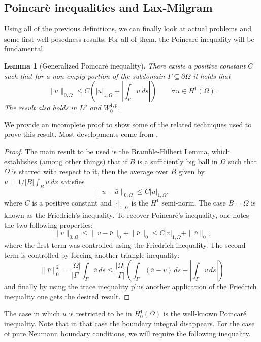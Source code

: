 \documentclass{article}
\newtheorem{lemma}{Lemma}
\begin{document}
\subsection{Poincarè inequalities and Lax-Milgram}


Using all of the previous definitions, we can finally look at actual problems and some first well-posedness results. For all of them, the Poincaré inequality will be fundamental.

\begin{lemma}[Generalized Poincaré inequality] There exists a positive constant $C$ such that for a non-empty portion of the subdomain $\Gamma \subseteq \partial\Omega$ it holds that
        $$ \| u \|_{0,\Omega} \leq C\left(| u |_{1,\Omega} + \left|\int_\Gamma u\,ds\right| \right) \qquad \forall u \in H^1(\Omega). $$
The result also holds in $L^p$ and $W_0^{1,p}$. 
\end{lemma}

We provide an incomplete proof to show some of the related techniques used to prove this result. Most developments come from \cite{brenner2008mathematical}.
\begin{proof}
    The main result to be used is the Bramble-Hilbert Lemma, which establishes (among other things) that if $B$ is a sufficiently big ball in $\Omega$ such that $\Omega$ is starred with respect to it, then the average over $B$ given by $\bar u = 1/|B|\int_B u\,dx$ satisfies
    $$ \| u - \bar u \|_{0,\Omega} \leq C| u |_{1,\Omega}, $$
where $C$ is a positive constant and $|\cdot|_{1,\Omega}$ is the $H^1$ semi-norm. The case $B=\Omega$ is known as the Friedrich's inequality. To recover Poincaré's inequality, one notes the two following properties: 
    $$ \|v \|_{0,\Omega} \leq \| v - \bar v\|_0 + \| \bar v\|_0 \leq C | v |_{1,\Omega} + \|\bar v\|_0,$$
where the first term was controlled using the Friedrich inequality. The second term is controlled by forcing another triangle inequality: 
    $$ \| \bar v\|^2_0 = \frac{|\Omega|}{|\Gamma|} \int_\Gamma \bar v\,ds \leq \frac{|\Omega|}{|\Gamma|}\left(\int_\Gamma (\bar v - v)\,ds + \left| \int_\Gamma v \,ds \right| \right)$$
and finally by using the trace inequality plus another application of the Friedrich inequality one gets the desired result. 
\end{proof}

The case in which $u$ is restricted to be in $H_0^1(\Omega)$ is the well-known Poincaré inequality. Note that in that case the boundary integral disappears. For the case of pure Neumann boundary conditions, we will require the following inequality.
\end{document}
